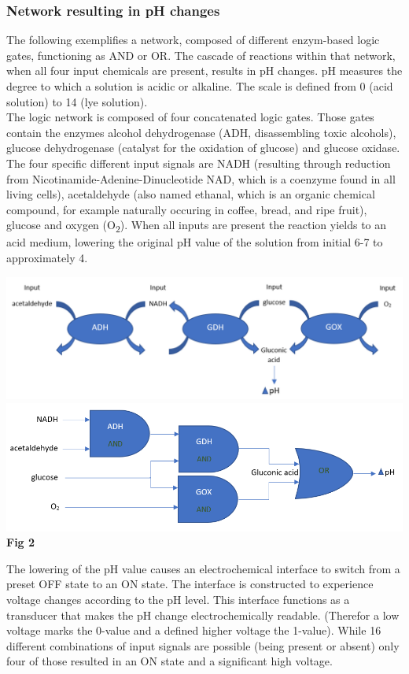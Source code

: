 \documentclass[runningheads]{llncs}
\begin{document}
		\subsubsection{Network resulting in pH changes} The following exemplifies a network, composed of different enzym-based logic gates, functioning as AND or OR. The cascade of reactions within that network, when all four input chemicals are present, results in pH changes. pH measures the degree to which a solution is acidic or alkaline. The scale is defined from 0 (acid solution) to 14 (lye solution).\\
		The logic network is composed of four concatenated logic gates. Those gates contain the enzymes alcohol dehydrogenase (ADH, disassembling toxic alcohols), glucose dehydrogenase (catalyst for the oxidation of glucose) and glucose oxidase. The four specific different input signals are NADH (resulting through reduction from Nicotinamide-Adenine-Dinucleotide NAD, which is a coenzyme found in all living cells),  acetaldehyde (also named ethanal, which is an organic chemical compound, for example naturally occuring in coffee, bread, and ripe fruit), glucose and oxygen (O\textsubscript{2}).
	 	When all inputs are present the reaction yields to an acid medium, lowering the original pH value of the solution from initial 6-7 to approximately 4. \cite{original}\cite{chemie}
	\begin{center}
		\includegraphics[scale= 0.38]{pics/network1.png}  
		\includegraphics[scale= 0.4]{pics/network2.png} \\
	\textbf{Fig 2} 
		\end{center}
		The lowering of the pH value causes an electrochemical interface to switch from a preset OFF state to an ON state. The interface is constructed to experience voltage changes according to the pH level. This interface functions as a transducer that makes the pH change electrochemically readable. (Therefor a low voltage marks the 0-value and a defined higher voltage the 1-value). While 16 different combinations of input signals are possible (being present or absent) only four of those resulted in an ON state and a significant high voltage. \cite{original}
		
\end{document}
